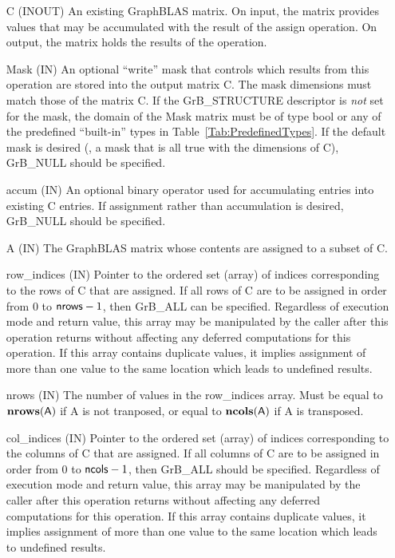 \begin{itemize}[leftmargin=1.1in]
    \item[{\sf C}]    ({\sf INOUT}) An existing GraphBLAS matrix. On input,
    the matrix provides values that may be accumulated with the result of the
    assign operation.  On output, the matrix holds the results of the
    operation.

    \item[{\sf Mask}] ({\sf IN}) An optional ``write'' mask that controls which
    results from this operation are stored into the output matrix {\sf C}. The 
    mask dimensions must match those of the matrix {\sf C}. If the 
    {\sf GrB\_STRUCTURE} descriptor is {\em not} set for the mask, the domain of the 
    {\sf Mask} matrix must be of type {\sf bool} or any of the predefined 
    ``built-in'' types in Table~\ref{Tab:PredefinedTypes}.  If the default
    mask is desired (\ie, a mask that is all {\sf true} with the dimensions of {\sf C}), 
    {\sf GrB\_NULL} should be specified.

    \item[{\sf accum}] ({\sf IN}) An optional binary operator used for accumulating
    entries into existing {\sf C} entries.
    If assignment rather than accumulation is
    desired, {\sf GrB\_NULL} should be specified.

    \item[{\sf A}]     ({\sf IN}) The GraphBLAS matrix whose contents are 
    assigned to a subset of {\sf C}.
    
    \item[{\sf row\_indices}] ({\sf IN}) Pointer to the ordered set (array) of 
    indices corresponding to the rows of {\sf C} that are assigned.  If all rows
    of {\sf C} are to be assigned in order from $0$ to ${\sf nrows} - 1$, then 
    {\sf GrB\_ALL} can be specified.  Regardless of execution mode and return 
    value, this array may be manipulated by the caller after this operation 
    returns without affecting any deferred computations for this operation.
    If this array contains duplicate values, it implies assignment of more 
    than one value to the same location which leads to undefined results.

    \item[{\sf nrows}] ({\sf IN}) The number of values in the {\sf row\_indices}
    array. Must be equal to $\bold{nrows}({\sf A})$ if {\sf A} is not tranposed,
    or equal to $\bold{ncols}({\sf A})$ if {\sf A} is transposed.

    \item[{\sf col\_indices}] ({\sf IN}) Pointer to the ordered set (array) of 
    indices corresponding to the columns of {\sf C} that are assigned.  If all 
    columns of {\sf C} are to be assigned in order from $0$ to ${\sf ncols} - 1$, 
    then {\sf GrB\_ALL} should be specified.  Regardless of execution mode and return
    value, this array may be manipulated by the caller after this operation 
    returns without affecting any deferred computations for this operation.
    If this array contains duplicate values, it implies assignment of more 
    than one value to the same location which leads to undefined results.
    

\end{itemize}
